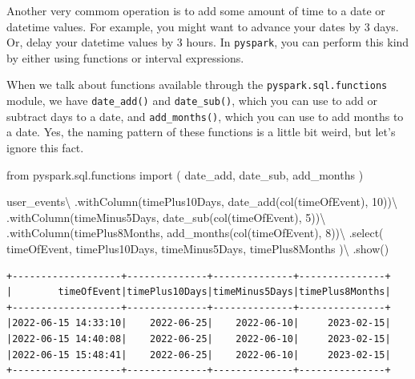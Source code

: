 \documentclass[
  11pt,
  letterpaper,
  DIV=11,
  numbers=noendperiod]{scrreprt}
\newenvironment{Shaded}{\begin{snugshade}}{\end{snugshade}}
\newcommand{\DecValTok}[1]{\textcolor[rgb]{0.68,0.00,0.00}{#1}}
\newcommand{\ImportTok}[1]{\textcolor[rgb]{0.00,0.46,0.62}{#1}}
\newcommand{\NormalTok}[1]{\textcolor[rgb]{0.00,0.23,0.31}{#1}}
\newcommand{\OperatorTok}[1]{\textcolor[rgb]{0.37,0.37,0.37}{#1}}
\newcommand{\StringTok}[1]{\textcolor[rgb]{0.13,0.47,0.30}{#1}}
\begin{document}
Another very commom operation is to add some amount of time to a date or
datetime values. For example, you might want to advance your dates by 3
days. Or, delay your datetime values by 3 hours. In \texttt{pyspark},
you can perform this kind by either using functions or interval
expressions.

When we talk about functions available through the
\texttt{pyspark.sql.functions} module, we have \texttt{date\_add()} and
\texttt{date\_sub()}, which you can use to add or subtract days to a
date, and \texttt{add\_months()}, which you can use to add months to a
date. Yes, the naming pattern of these functions is a little bit weird,
but let's ignore this fact.

\begin{Shaded}
\begin{Highlighting}[]
\ImportTok{from}\NormalTok{ pyspark.sql.functions }\ImportTok{import}\NormalTok{ (}
\NormalTok{    date\_add,}
\NormalTok{    date\_sub,}
\NormalTok{    add\_months}
\NormalTok{)}

\NormalTok{user\_events}\OperatorTok{\textbackslash{}}
\NormalTok{    .withColumn(}\StringTok{\textquotesingle{}timePlus10Days\textquotesingle{}}\NormalTok{, date\_add(col(}\StringTok{\textquotesingle{}timeOfEvent\textquotesingle{}}\NormalTok{), }\DecValTok{10}\NormalTok{))}\OperatorTok{\textbackslash{}}
\NormalTok{    .withColumn(}\StringTok{\textquotesingle{}timeMinus5Days\textquotesingle{}}\NormalTok{, date\_sub(col(}\StringTok{\textquotesingle{}timeOfEvent\textquotesingle{}}\NormalTok{), }\DecValTok{5}\NormalTok{))}\OperatorTok{\textbackslash{}}
\NormalTok{    .withColumn(}\StringTok{\textquotesingle{}timePlus8Months\textquotesingle{}}\NormalTok{, add\_months(col(}\StringTok{\textquotesingle{}timeOfEvent\textquotesingle{}}\NormalTok{), }\DecValTok{8}\NormalTok{))}\OperatorTok{\textbackslash{}}
\NormalTok{    .select(}
        \StringTok{\textquotesingle{}timeOfEvent\textquotesingle{}}\NormalTok{, }\StringTok{\textquotesingle{}timePlus10Days\textquotesingle{}}\NormalTok{,}
        \StringTok{\textquotesingle{}timeMinus5Days\textquotesingle{}}\NormalTok{, }\StringTok{\textquotesingle{}timePlus8Months\textquotesingle{}}
\NormalTok{    )}\OperatorTok{\textbackslash{}}
\NormalTok{    .show()}
\end{Highlighting}
\end{Shaded}

\begin{verbatim}
+-------------------+--------------+--------------+---------------+
|        timeOfEvent|timePlus10Days|timeMinus5Days|timePlus8Months|
+-------------------+--------------+--------------+---------------+
|2022-06-15 14:33:10|    2022-06-25|    2022-06-10|     2023-02-15|
|2022-06-15 14:40:08|    2022-06-25|    2022-06-10|     2023-02-15|
|2022-06-15 15:48:41|    2022-06-25|    2022-06-10|     2023-02-15|
+-------------------+--------------+--------------+---------------+
\end{verbatim}
\end{document}
